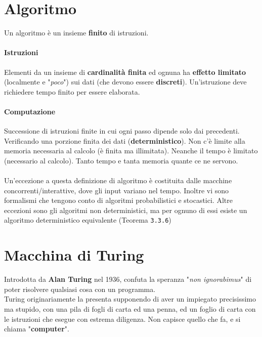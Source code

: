 \documentclass[10pt]{book}
\begin{document}
\section{Algoritmo}
Un algoritmo è un insieme \textbf{finito} di istruzioni.
\paragraph{Istruzioni} Elementi da un insieme di \textbf{cardinalità finita} ed ognuna ha \textbf{effetto limitato} (localmente e "\textit{poco}") sui dati (che devono essere \textbf{discreti}). Un'istruzione deve richiedere tempo finito per essere elaborata.
\paragraph{Computazione} Successione di istruzioni finite in cui ogni passo dipende solo dai precedenti. Verificando una porzione finita dei dati (\textbf{deterministico}). Non c'è limite alla memoria necessaria al calcolo (è finita ma illimitata). Neanche il tempo è limitato (necessario al calcolo). Tanto tempo e tanta memoria quante ce ne servono.\\\\
Un'eccezione a questa definizione di algoritmo è costituita dalle macchine concorrenti/interattive, dove gli input variano nel tempo. Inoltre vi sono formalismi che tengono conto di algoritmi probabilistici e stocastici. Altre eccezioni sono gli algoritmi non deterministici, ma per ognuno di essi esiste un algoritmo deterministico equivalente (Teorema \texttt{3.3.6})
\pagebreak
\section{Macchina di Turing}
Introdotta da \textbf{Alan Turing} nel 1936, confuta la speranza "\textit{non ignorabimus}" di poter risolvere qualsiasi cosa con un programma.\\
Turing originariamente la presenta supponendo di aver un impiegato precisissimo ma stupido, con una pila di fogli di carta ed una penna, ed un foglio di carta con le istruzioni che esegue con estrema diligenza. Non capisce quello che fa, e si chiama "\textbf{computer}".
\end{document}
